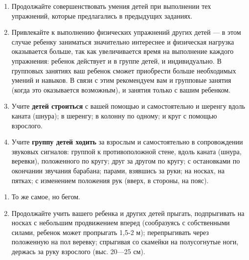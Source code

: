 \documentclass[a5paper]{book}
\begin{document}
\begin{enumerate}
\def\labelenumi{\arabic{enumi}.}
\item
  
  Продолжайте совершенствовать умения детей при выполнении тех
  упражнений, которые предлагались в предыдущих заданиях.
  
\item
  
  Привлекайте к выполнению физических упражнений других детей --- в этом
  случае ребенку заниматься значительно интереснее и физическая нагрузка
  оказывается больше, так как увеличивается время на выполнение каждого
  упражнения: ребенок действует и в группе детей, и индивидуально. В
  групповых занятиях ваш ребенок сможет приобрести больше необходимых
  умений и навыков. В связи с этим рекомендуем вам и групповые занятия
  (когда это оказывается возможным), и занятия только с вашим ребенком.
  
\item
  
  Учите \textbf{детей строиться} с вашей помощью и самостоятельно и
  шеренгу вдоль каната (шнура); в шеренгу; в колонну по одному; и круг с
  помощью взрослого.
  
\item
  
  Учите \textbf{группу детей ходить} за взрослым и самостоятельно в
  сопровождении звуковых сигналов: группой к противоположной стене,
  вдоль каната (шнура, веревки), положенного по кругу; друг за другом по
  кругу; с остановками по окончании звучания барабана; парами, взявшись
  за руки; на носках, на пятках; с изменением положения рук (вверх, в
  стороны, на пояс).
  
\end{enumerate}

\begin{enumerate}
\def\labelenumi{\arabic{enumi}.}
\setcounter{enumi}{4}
\item
  
  То же самое, но бегом.
  
\item
  
  Продолжайте учить вашего ребенка и других детей прыгать, подпрыгивать
  на носках с небольшим продвижением вперед (сообразуясь с собственными
  силами, ребенок может пропрыгать 1,5-2 м); перепрыгивать через
  положенную на пол веревку; спрыгивая со скамейки на полусогнутые ноги,
  держась за руку взрослого (выс. 20---25 см).
  
\end{enumerate}
\end{document}
